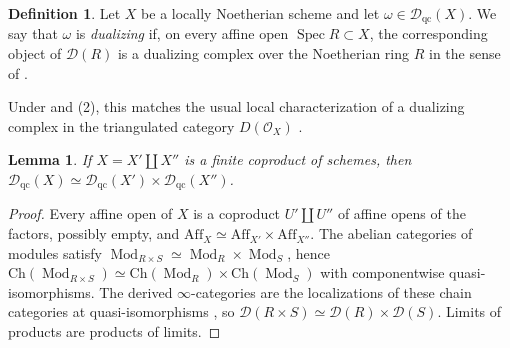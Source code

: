 \documentclass[11pt]{amsart}
\newcommand{\cO}{\mathcal{O}}
\newcommand{\cD}{\mathcal{D}}
\newcommand{\Mod}{\operatorname{Mod}}
\newcommand{\Spec}{\operatorname{Spec}}
\newcommand{\Aff}{\mathrm{Aff}}
\newcommand{\Dqc}{\mathcal D_{\mathrm{qc}}}
\theoremstyle{plain}
\newtheorem{lemma}[lemma]{Lemma}
\theoremstyle{definition}
\newtheorem{definition}[definition]{Definition}
\numberwithin{equation}{section}
\begin{document}
\begin{definition}\label{def:dualizing-dqc}
Let $X$ be a locally Noetherian scheme and let $\omega\in\Dqc(X)$.
We say that $\omega$ is \textit{dualizing} if, on every affine open $\Spec R\subset X$, the corresponding object of $\cD(R)$ is a dualizing complex over the Noetherian ring $R$ in the sense of \cite[\href{https://stacks.math.columbia.edu/tag/0A7B}{Tag 0A7B}]{SP}.
\end{definition}
Under  and (2), this matches the usual local characterization of a dualizing complex in the triangulated category $D(\cO_X)$ \cite[\href{https://stacks.math.columbia.edu/tag/0A86}{Tag 0A86}; \href{https://stacks.math.columbia.edu/tag/0A87}{Tag 0A87}]{SP}.

\begin{lemma}\label{lem:dqc-coproduct}
If $X=X'\amalg X''$ is a finite coproduct of schemes, then $\Dqc(X)\simeq\Dqc(X')\times\Dqc(X'')$.
\end{lemma}
\begin{proof}
Every affine open of $X$ is a coproduct $U'\amalg U''$ of affine opens of the factors, possibly empty, and $\Aff_X\simeq\Aff_{X'}\times\Aff_{X''}$.
The abelian categories of modules satisfy $\Mod_{R\times S}\simeq\Mod_R\times\Mod_S$, hence $\mathrm{Ch}(\Mod_{R\times S})\simeq\mathrm{Ch}(\Mod_R)\times\mathrm{Ch}(\Mod_S)$ with componentwise quasi-isomorphisms.
The derived $\infty$-categories are the localizations of these chain categories at quasi-isomorphisms \cite[Definition 1.3.5.8; Proposition 1.3.5.15]{HA}, so $\cD(R\times S)\simeq\cD(R)\times\cD(S)$.
Limits of products are products of limits.
\end{proof}
\end{document}
